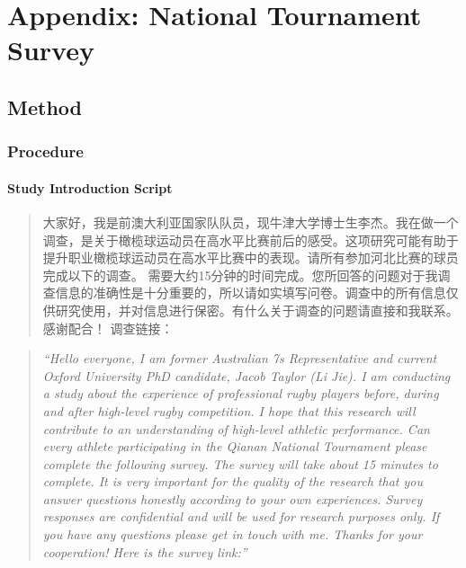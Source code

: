 \chapter{Appendix: National Tournament Survey\label{app8:tournamentSurvey}}












\section{Method\label{app8:method}}



\subsection{Procedure\label{app8:procedure}}


\subsubsection{Study Introduction Script\label{app8:studyIntro}}

\begin{CJK}{UTF8}{gbsn}
  \begin{quotation}
    大家好，我是前澳大利亚国家队队员，现牛津大学博士生李杰。我在做一个调查，是关于橄榄球运动员在高水平比赛前后的感受。这项研究可能有助于提升职业橄榄球运动员在高水平比赛中的表现。请所有参加河北比赛的球员完成以下的调查。
    需要大约15分钟的时间完成。您所回答的问题对于我调查信息的准确性是十分重要的，所以请如实填写问卷。调查中的所有信息仅供研究使用，并对信息进行保密。有什么关于调查的问题请直接和我联系。感谢配合！ 调查链接：
  \end{quotation}
\end{CJK}

\begin{quotation}
      \textit{``Hello everyone, I am former Australian 7s Representative and current Oxford University PhD candidate, Jacob Taylor (Li Jie). I am conducting a study about the experience of professional rugby players before, during and after high-level rugby competition. I hope that this research will contribute to an understanding of high-level athletic performance. Can every athlete participating in the Qianan National Tournament please complete the following survey. The survey will take about 15 minutes to complete. It is very important for the quality of the research that you answer questions honestly according to your own experiences. Survey responses are confidential and will be used for research purposes only. If you have any questions please get in touch with me. Thanks for your cooperation! Here is the survey link:''}
\end{quotation}




